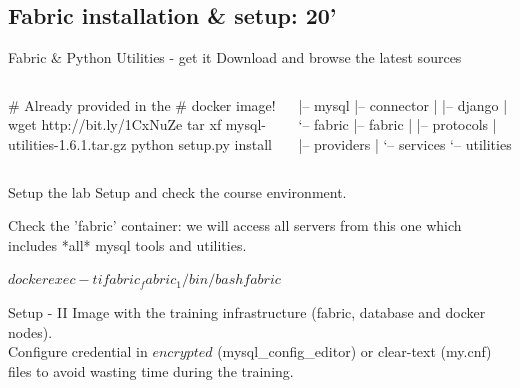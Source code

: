\documentclass{beamer}[10]
\begin{document}
\subsection{Fabric installation \& setup: 20'}
\begin{pyframe}{Fabric \& Python Utilities - get it}
Download and browse the latest sources
\begin{columns}[t]

    \begin{bashcode}
    # Already provided in the
    #  docker image!
    wget http://bit.ly/1CxNuZe
    tar xf mysql-utilities-1.6.1.tar.gz
    python setup.py install
    \end{bashcode}

\begin{bashcode}
   |-- mysql
   |-- connector
   |   |-- django
   |   `-- fabric
   |-- fabric
   |   |-- protocols
   |   |-- providers
   |   `-- services
   `-- utilities
\end{bashcode}

\end{columns}

\end{pyframe}

\begin{pyframe}{Setup the lab}
Setup and check the course environment.

Check the 'fabric' container: we will access all servers from this
 one which includes *all* mysql tools and utilities.
\begin{bashcode}
$ docker exec -ti fabric_fabric_1 /bin/bash
fabric$
\end{bashcode}
\end{pyframe}


\begin{pyframe}{Setup - II}
Image with the training infrastructure (fabric, database and docker nodes).
\\
Configure credential in $encrypted$ (mysql\_config\_editor)
 or clear-text (my.cnf) files to avoid wasting time during
the training.
 \\
\end{pyframe}
\end{document}

